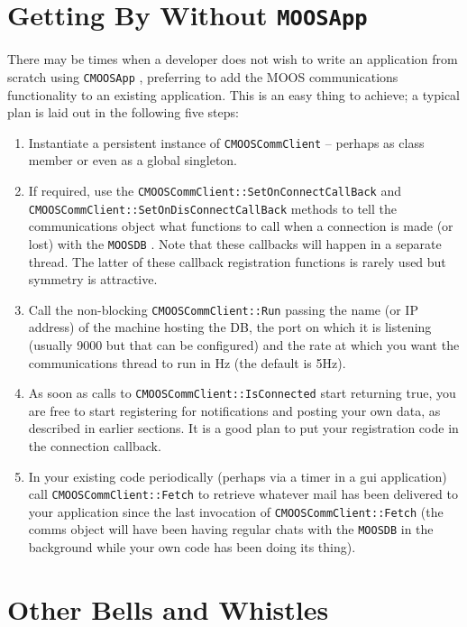 \documentclass[a4paper,10pt]{article}
\newcommand{\Code}[1]{\texttt{#1} }
\newcommand{\code}[1]{\Code{#1} }
\begin{document}
\section{Getting By Without \code{MOOSApp}}


There may be times when a developer does not wish to write an application from scratch using \code{CMOOSApp}, preferring to add the MOOS communications functionality to an existing application. This is an easy thing to achieve; a typical plan is laid out in the following five steps:

\begin{enumerate}
\item Instantiate a persistent instance of \code{CMOOSCommClient} -- perhaps as class member or even as a global singleton.
\item If required, use the \code{CMOOSCommClient::SetOnConnectCallBack} and \code{CMOOSCommClient::SetOnDisConnectCallBack} methods to tell the communications object what functions to call when a connection is made (or lost) with the \code{MOOSDB}. Note that these callbacks will happen in a separate thread. The latter of these callback registration functions is rarely used but symmetry is attractive.
\item Call the non-blocking \code{CMOOSCommClient::Run} passing the name (or IP address) of the machine hosting the DB, the port on which it is listening (usually 9000 but that can be configured) and the rate at which you want the communications thread to run in Hz (the default is 5Hz).
\item As soon as calls to \code{CMOOSCommClient::IsConnected} start returning true, you are free to start registering for notifications and posting your own data, as described in earlier sections. It is a good plan to put your registration code in the connection callback.
\item In your existing code periodically (perhaps via a timer in a gui application) call \code{CMOOSCommClient::Fetch} to retrieve whatever mail has been delivered to your application since the last invocation of \code{CMOOSCommClient::Fetch} (the comms object will have been having regular chats with the \code{MOOSDB} in the background while your own code has been doing its thing).
\end{enumerate}






\section{Other Bells and Whistles}
\end{document}
